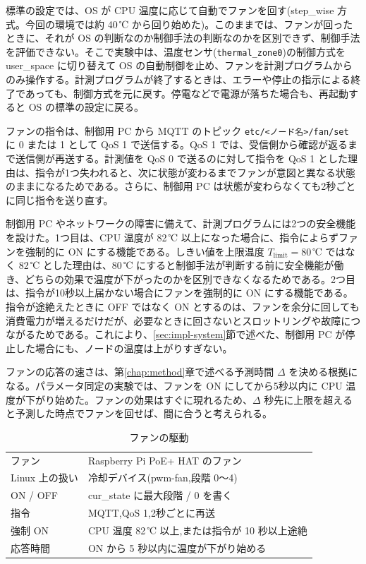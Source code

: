 標準の設定では、OS が CPU 温度に応じて自動でファンを回す(step\_wise 方式。今回の環境では約 40\,℃ から回り始めた)。このままでは、ファンが回ったときに、それが OS の判断なのか制御手法の判断なのかを区別できず、制御手法を評価できない。そこで実験中は、温度センサ(\texttt{thermal\_zone0})の制御方式を user\_space に切り替えて OS の自動制御を止め、ファンを計測プログラムからのみ操作する。計測プログラムが終了するときは、エラーや停止の指示による終了であっても、制御方式を元に戻す。停電などで電源が落ちた場合も、再起動すると OS の標準の設定に戻る。

ファンの指令は、制御用 PC から MQTT のトピック \texttt{etc/<ノード名>/fan/set} に 0 または 1 として QoS 1 で送信する。QoS 1 では、受信側から確認が返るまで送信側が再送する。計測値を QoS 0 で送るのに対して指令を QoS 1 とした理由は、指令が1つ失われると、次に状態が変わるまでファンが意図と異なる状態のままになるためである。さらに、制御用 PC は状態が変わらなくても2秒ごとに同じ指令を送り直す。

制御用 PC やネットワークの障害に備えて、計測プログラムには2つの安全機能を設けた。1つ目は、CPU 温度が 82\,℃ 以上になった場合に、指令によらずファンを強制的に ON にする機能である。しきい値を上限温度 $T_{\mathrm{limit}}=80$\,℃ ではなく 82\,℃ とした理由は、80\,℃ にすると制御手法が判断する前に安全機能が働き、どちらの効果で温度が下がったのかを区別できなくなるためである。2つ目は、指令が10秒以上届かない場合にファンを強制的に ON にする機能である。指令が途絶えたときに OFF ではなく ON とするのは、ファンを余分に回しても消費電力が増えるだけだが、必要なときに回さないとスロットリングや故障につながるためである。これにより、\ref{sec:impl-system}節で述べた、制御用 PC が停止した場合にも、ノードの温度は上がりすぎない。

ファンの応答の速さは、第\ref{chap:method}章で述べる予測時間 $\Delta$ を決める根拠になる。パラメータ同定の実験では、ファンを ON にしてから5秒以内に CPU 温度が下がり始めた。ファンの効果はすぐに現れるため、$\Delta$ 秒先に上限を超えると予測した時点でファンを回せば、間に合うと考えられる。

\begin{table}[tb]
  \centering
  \caption{ファンの駆動}
  \label{tab:fan}
  \begin{tabular}{ll}
    \toprule
    ファン & Raspberry Pi PoE+ HAT のファン \\
    Linux 上の扱い & 冷却デバイス(pwm-fan,段階 0〜4) \\
    ON / OFF & cur\_state に最大段階 / 0 を書く \\
    指令 & MQTT,QoS 1,2秒ごとに再送 \\
    強制 ON & CPU 温度 82\,℃ 以上,または指令が 10 秒以上途絶 \\
    応答時間 & ON から 5 秒以内に温度が下がり始める \\
    \bottomrule
  \end{tabular}
\end{table}


